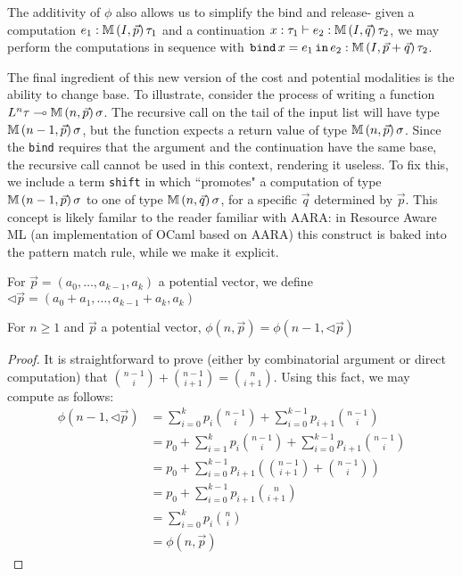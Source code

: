 The additivity of $\phi$ also allows us to simplify the bind and release- given a computation $e_1 : \mathbb{M} \, (I,\vec{p}) \, \tau_1$ and a continuation $x : \tau_1 \vdash e_2 : \mathbb{M} \, (I,\vec{q}) \, \tau_2$,  we may perform the computations in sequence with $\texttt{bind}\, x = e_1 \, \texttt{in}\, e_2 : \mathbb{M} \, (I,\vec{p} + \vec{q}) \, \tau_2$.

The final ingredient of this new version of the cost and potential modalities is the ability to change base. To illustrate, consider the process of writing a function $L^n \tau \multimap \mathbb{M} \, (n,\vec{p}) \, \sigma$. The recursive call on the tail of the input list will have type $\mathbb{M} \, (n-1,\vec{p}) \, \sigma$, but the function expects a return value of type $\mathbb{M} \, (n,\vec{p}) \, \sigma$. Since the \texttt{bind} requires that the argument and the continuation have the same base, the recursive call cannot be used in this context, rendering it useless. To fix this, we include a term \texttt{shift} in \dlambdaamor which ``promotes" a computation of type $\mathbb{M} \, (n-1,\vec{p}) \, \sigma$ to one of type $\mathbb{M} \, (n,\vec{q}) \, \sigma$, for a specific $\vec{q}$ determined by $\vec{p}$. This concept is likely familar to the reader familiar with AARA: in Resource Aware ML (an implementation of OCaml based on AARA) this construct is baked into the pattern match rule, while we make it explicit.

\begin{definition}
For $\vec{p} = (a_0,\dots,a_{k-1},a_k)$ a potential vector, we define $\lhd \vec{p} = (a_0 + a_1,\dots,a_{k-1} + a_k,a_k)$
\end{definition}

\begin{theorem}
For $n \geq 1$ and $\vec{p}$ a potential vector, $\phi(n,\vec{p}) = \phi(n-1,\lhd \vec{p})$
\label{thm:raml-shift}
\end{theorem}
\begin{proof}
It is straightforward to prove (either by combinatorial argument or direct computation) that $\binom{n-1}{i} + \binom{n-1}{i+1} = \binom{n}{i+1}$. Using this fact,
we may compute as follows:
\begin{align*}
  \phi(n-1,\lhd \vec{p}) &= \sum_{i=0}^k p_i\binom{n-1}{i} + \sum_{i=0}^{k-1} p_{i+1}\binom{n-1}{i}\\
                         &= p_0 + \sum_{i=1}^k p_i\binom{n-1}{i} + \sum_{i=0}^{k-1} p_{i+1}\binom{n-1}{i}\\
                         &= p_0 + \sum_{i=0}^{k-1} p_{i+1}\left(\binom{n-1}{i+1} + \binom{n-1}{i}\right)\\
                         &= p_0 + \sum_{i=0}^{k-1} p_{i+1}\binom{n}{i+1}\\
                         &= \sum_{i=0}^k p_i \binom{n}{i}\\
                         &= \phi(n,\vec{p})
\end{align*}
\end{proof}

